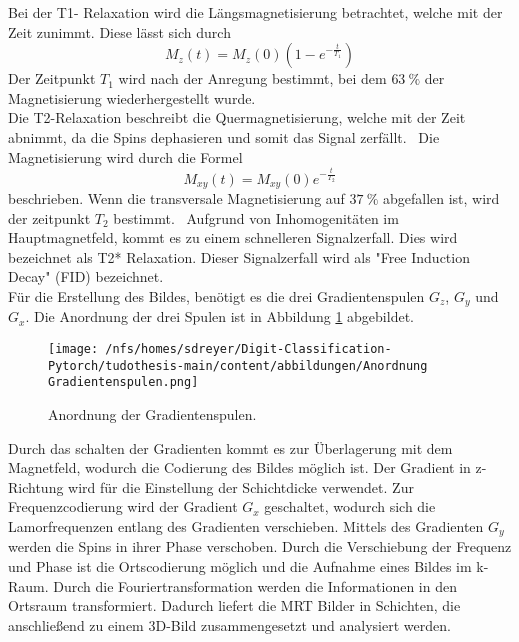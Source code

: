 Bei der T1- Relaxation wird die Längsmagnetisierung betrachtet, welche mit der Zeit zunimmt.
Diese lässt sich durch 
\begin{equation}
    M_z(t) = M_z(0) (1 - e^{-\frac{t}{T_1}})
\end{equation}
Der Zeitpunkt $T_1$ wird nach der Anregung bestimmt, bei dem $\qty{63}{\%}$ der Magnetisierung wiederhergestellt wurde.~\cite{Pollmann}\\

Die T2-Relaxation beschreibt die Quermagnetisierung, welche mit der Zeit abnimmt, da die Spins dephasieren und somit das Signal zerfällt.~\cite{Dössel}
Die Magnetisierung wird durch die Formel
\begin{equation}
    M_{xy}(t) = M_{xy}(0) e^{-\frac{t}{T_2}} 
\end{equation}
beschrieben.
Wenn die transversale Magnetisierung auf $\qty{37}{\%}$ abgefallen ist, wird der zeitpunkt $T_2$ bestimmt.~\cite{Pollmann}
Aufgrund von Inhomogenitäten im Hauptmagnetfeld, kommt es zu einem schnelleren Signalzerfall. Dies wird bezeichnet als T2* Relaxation.
Dieser Signalzerfall wird als "Free Induction Decay" (FID) bezeichnet.~\cite{Dössel}\\


Für die Erstellung des Bildes, benötigt es die drei Gradientenspulen $G_z$, $G_y$ und $G_x$. Die Anordnung der drei Spulen 
ist in Abbildung \ref{fig:an Grad} abgebildet.
\begin{figure}[htbp]
  \centering
  \texttt{[image: /nfs/homes/sdreyer/Digit-Classification-Pytorch/tudothesis-main/content/abbildungen/Anordnung Gradientenspulen.png]}
  \caption{Anordnung der Gradientenspulen.\cite{Schlegel}}
  \label{fig:an Grad}
\end{figure}
Durch das schalten der Gradienten kommt es zur Überlagerung mit dem Magnetfeld, wodurch die Codierung des Bildes möglich ist.
Der Gradient in z-Richtung wird für die Einstellung der Schichtdicke verwendet. 
Zur Frequenzcodierung wird der Gradient $G_x$ geschaltet, wodurch sich die Lamorfrequenzen entlang des Gradienten verschieben.
Mittels des Gradienten $G_y$ werden die Spins in ihrer Phase verschoben.
Durch die Verschiebung der Frequenz und Phase ist die Ortscodierung möglich und die Aufnahme eines Bildes im k-Raum.
Durch die Fouriertransformation werden die Informationen in den Ortsraum transformiert.
Dadurch liefert die MRT Bilder in Schichten, die anschließend zu einem 3D-Bild zusammengesetzt und analysiert werden.~\cite{pabst2013}

